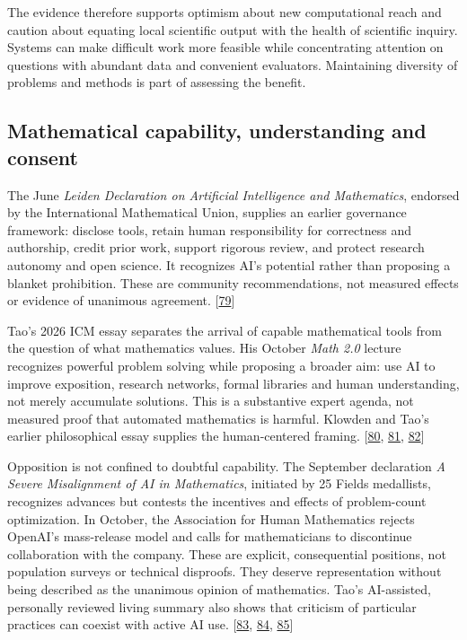 The evidence therefore supports optimism about new computational reach and caution about equating local scientific output with the health of scientific inquiry. Systems can make difficult work more feasible while concentrating attention on questions with abundant data and convenient evaluators. Maintaining diversity of problems and methods is part of assessing the benefit.



\subsection*{Mathematical capability, understanding and consent}
The June \emph{Leiden Declaration on Artificial Intelligence and Mathematics}, endorsed by the International Mathematical Union, supplies an earlier governance framework: disclose tools, retain human responsibility for correctness and authorship, credit prior work, support rigorous review, and protect research autonomy and open science. It recognizes AI's potential rather than proposing a blanket prohibition. These are community recommendations, not measured effects or evidence of unanimous agreement. [\hyperlink{ref-leiden2026}{79}]


Tao's 2026 ICM essay separates the arrival of capable mathematical tools from the question of what mathematics values. His October \emph{Math 2.0} lecture recognizes powerful problem solving while proposing a broader aim: use AI to improve exposition, research networks, formal libraries and human understanding, not merely accumulate solutions. This is a substantive expert agenda, not measured proof that automated mathematics is harmful. Klowden and Tao's earlier philosophical essay supplies the human-centered framing. [\hyperlink{ref-taoicm2026}{80}, \hyperlink{ref-taomath2026}{81}, \hyperlink{ref-klowdentao2026}{82}]


Opposition is not confined to doubtful capability. The September declaration \emph{A Severe Misalignment of AI in Mathematics}, initiated by 25 Fields medallists, recognizes advances but contests the incentives and effects of problem-count optimization. In October, the Association for Human Mathematics rejects OpenAI's mass-release model and calls for mathematicians to discontinue collaboration with the company. These are explicit, consequential positions, not population surveys or technical disproofs. They deserve representation without being described as the unanimous opinion of mathematics. Tao's AI-assisted, personally reviewed living summary also shows that criticism of particular practices can coexist with active AI use. [\hyperlink{ref-mathmisalignment2026}{83}, \hyperlink{ref-ahm2026}{84}, \hyperlink{ref-taoliving2026}{85}]




